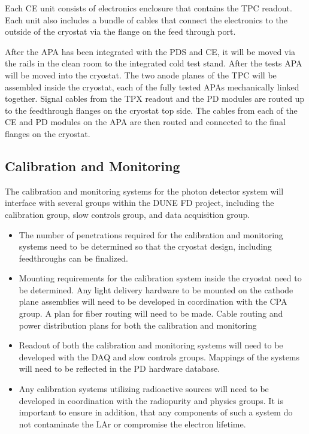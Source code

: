 Each CE unit consists of electronics enclosure that contains the TPC readout. Each unit also includes a bundle of cables that connect the electronics to the outside of the cryostat via the flange on the feed through port. 

After the APA has been integrated with the PDS and CE, it will be moved via the rails in the clean room to the integrated cold test stand. After the tests APA will be moved into the cryostat. The two anode planes of the TPC will be assembled inside the cryostat, each of the fully tested APAs mechanically linked together. Signal cables from the TPX readout and the PD modules are routed up to the feedthrough flanges on the cryostat top side. The cables from each of the CE and PD modules on the APA are then routed and connected to the final flanges on the cryostat.

\subsection{Calibration and Monitoring}
\label{sec:fdsp-pd-install-calib}

The calibration and monitoring systems for the photon detector system will interface with several groups within the DUNE FD project, including the calibration group, slow controls group, and data acquisition group.

\begin{itemize}
\item The number of penetrations required for the calibration and monitoring systems need to be determined so that the cryostat design, including feedthroughs can be finalized.
\item Mounting requirements for the calibration system inside the cryostat need to be determined. Any light delivery hardware to be mounted on the cathode plane assemblies will need to be developed in coordination with the CPA group. A plan for fiber routing will need to be made. Cable routing and power distribution plans for both the calibration and monitoring
\item Readout of both the calibration and monitoring systems will need to be developed with the DAQ and slow controls groups. Mappings of the systems will need to be reflected in the PD hardware database.
\item Any calibration systems utilizing radioactive sources will need to be developed in coordination with the radiopurity and physics groups. It is important to ensure in addition, that any components of such a system do not contaminate the LAr or compromise the electron lifetime.
\end{itemize}
 



